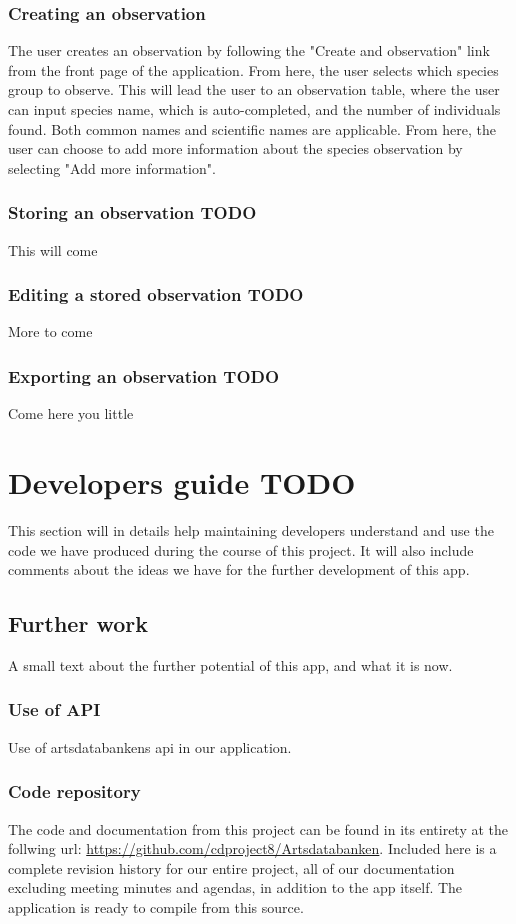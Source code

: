 \subsubsection{Creating an observation}
The user creates an observation by following the "Create and observation" link from the front page of the application. From here, the user selects which species group to observe. This will lead the user to an observation table, where the user can input species name, which is auto-completed, and the number of individuals found. Both common names and scientific names are applicable. From here, the user can choose to add more information about the species observation by selecting "Add more information".

\subsubsection{Storing an observation TODO}
This will come

\subsubsection{Editing a stored observation TODO}
More to come

\subsubsection{Exporting an observation TODO}
Come here you little

\section{Developers guide TODO}
This section will in details help maintaining developers understand and use the code we have produced during the course of this project. It will also include comments about the ideas we have for the further development of this app.

\subsection{Further work}
A small text about the further potential of this app, and what it is now.
\subsubsection{Use of API}
Use of artsdatabankens api in our application.

\subsubsection{Code repository}
The code and documentation from this project can be found in its entirety at the follwing url: \url{https://github.com/cdproject8/Artsdatabanken}. Included here is a complete revision history for our entire project, all of our documentation excluding meeting minutes and agendas, in addition to the app itself. The application is ready to compile from this source.

